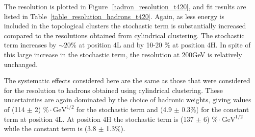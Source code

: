 
The resolution is plotted in Figure~\ref{hadron_resolution_t420}, and fit results are listed in Table~\ref{table_resolution_hadrons_t420}. Again, as less energy is included in the topological clusters the stochastic term is substantially increased compared to the resolutions obtained from cylindrical clustering. The stochastic term increases by $\sim 20 \%$ at position 4L and by 10-20 $\%$ at position 4H. In spite of this large increase in the stochastic term, the resolution at 200GeV is relatively unchanged. 

The systematic effects considered here are the same as those that were considered for the resolution to hadrons obtained using cylindrical clustering.  These uncertainties are again dominated by the choice of hadronic weights, giving values of (114 $\pm$ 2) $\% \cdot \mathrm{GeV}^{1/2}$ for the stochastic term and (4.9 $\pm$ 0.3\%) for the constant term at position 4L. At position 4H the stochastic term is (137 $\pm$ 6) $\% \cdot \mathrm{GeV}^{1/2}$while the constant term is (3.8 $\pm$ 1.3\%).





%
%

